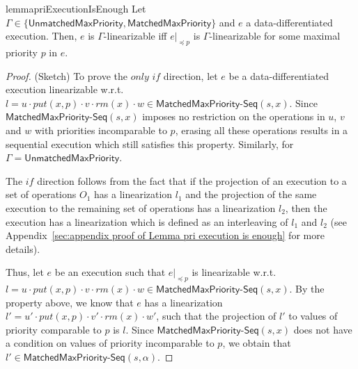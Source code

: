 \begin{restatable}{lemma}{priExecutionIsEnough}
\label{lemma:pri execution is enough}
Let $\Gamma\in \{\mathsf{UnmatchedMaxPriority}, \mathsf{MatchedMaxPriority}\}$ and $e$ a data-differentiated execution. Then, $e$ is $\Gamma$-linearizable iff $e\vert_{\preceq p}$ is $\Gamma$-linearizable for some maximal priority $p$ in $e$.
\end{restatable}
\begin {proof} (Sketch)
To prove the $\textit{only if}$ direction, let $e$ be a data-differentiated execution linearizable w.r.t. $l = u \cdot \textit{put}(x,p) \cdot v \cdot \textit{rm}(x) \cdot w \in \mathsf{MatchedMaxPriority}\mathsf{\text{-}Seq}(s,x)$. Since $\mathsf{MatchedMaxPriority}\mathsf{\text{-}Seq}(s,x)$ imposes no restriction on the operations in $u$, $v$ and $w$ with priorities incomparable to $p$, erasing all these operations results in a sequential execution which still satisfies this property. Similarly, for $\Gamma=\mathsf{UnmatchedMaxPriority}$.

The $\textit{if}$ direction follows from the fact that if the projection of an execution to a set of operations $O_1$ has a linearization $l_1$ and the projection of the same execution to the remaining set of operations has a linearization $l_2$, then the execution has a linearization which is defined as an interleaving of $l_1$ and $l_2$ (see Appendix~\ref{sec:appendix proof of Lemma pri execution is enough} for more details).

Thus, let $e$ be an execution such that $e\vert_{\preceq p}$ is linearizable w.r.t. $l = u \cdot \textit{put}(x,p) \cdot v \cdot \textit{rm}(x) \cdot w \in \mathsf{MatchedMaxPriority}\mathsf{\text{-}Seq}(s,x)$. By the property above, we know that $e$ has a linearization $l' = u' \cdot \textit{put}(x,p) \cdot v' \cdot \textit{rm}(x) \cdot w'$, such that the projection of $l'$ to values of priority comparable to $p$ is $l$.
Since $\mathsf{MatchedMaxPriority}\mathsf{\text{-}Seq}(s,x)$ does not have a condition on values of priority incomparable to $p$, we obtain that $l' \in \mathsf{MatchedMaxPriority}\mathsf{\text{-}Seq}(s,\alpha)$.
\end {proof}

